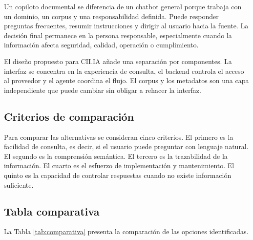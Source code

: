 Un copiloto documental se diferencia de un chatbot general porque trabaja con un dominio, un corpus y una responsabilidad definida. Puede responder preguntas frecuentes, resumir instrucciones y dirigir al usuario hacia la fuente. La decisión final permanece en la persona responsable, especialmente cuando la información afecta seguridad, calidad, operación o cumplimiento.

El diseño propuesto para CII.IA añade una separación por componentes. La interfaz se concentra en la experiencia de consulta, el backend controla el acceso al proveedor y el agente coordina el flujo. El corpus y los metadatos son una capa independiente que puede cambiar sin obligar a rehacer la interfaz.

\subsection{Criterios de comparación}

Para comparar las alternativas se consideran cinco criterios. El primero es la facilidad de consulta, es decir, si el usuario puede preguntar con lenguaje natural. El segundo es la comprensión semántica. El tercero es la trazabilidad de la información. El cuarto es el esfuerzo de implementación y mantenimiento. El quinto es la capacidad de controlar respuestas cuando no existe información suficiente.

\subsection{Tabla comparativa}

La Tabla \ref{tab:comparativa} presenta la comparación de las opciones identificadas.

